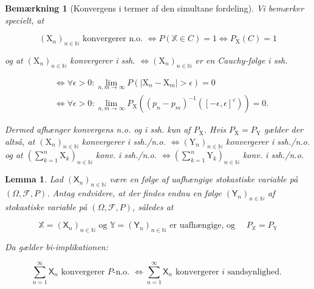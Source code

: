 \documentclass{article}
\newcommand{\1}{\mathbbm{1}}
\newtheorem{lemma}[theorem]{Lemma}
\newtheorem{remark}[theorem]{Bemærkning}
\theoremstyle{boxed}
\begin{document}
\begin{remark}[Konvergens i termer af den simultane fordeling] 
    Vi bemærker specielt, at

$$
\left(\mathrm{X}_n\right)_{n \in \mathbb{N}} \text { konvergerer n.o. } \Longleftrightarrow P(\mathbb{X} \in C)=1 \Longleftrightarrow P_{\mathrm{X}}(C)=1
$$

og at
$\left(\mathrm{X}_n\right)_{n \in \mathbb{N}}$ konvergerer i ssh. $\Longleftrightarrow\left(\mathrm{X}_n\right)_{n \in \mathbb{N}}$ er en Cauchy-følge i ssh.

$$
\begin{aligned}
& \Longleftrightarrow \forall \epsilon>0: \lim _{n, m \rightarrow \infty} P\left(\left|\mathrm{X}_n-\mathrm{X}_m\right|>\epsilon\right)=0 \\
& \Longleftrightarrow \forall \epsilon>0: \lim _{n, m \rightarrow \infty} P_{\mathrm{X}}\left(\left(p_n-p_m\right)^{-1}\left([-\epsilon, \epsilon]^c\right)\right)=0 .
\end{aligned}
$$


Dermed afhænger konvergens n.o. og i ssh. kun af $P_{\mathrm{X}}$.
Hvis $P_{\mathrm{X}}=P_{\mathrm{Y}}$ gælder der altså, at
$\left(\mathrm{X}_n\right)_{n \in \mathbb{N}}$ konvergerer i ssh./n.o. $\Longleftrightarrow\left(\mathrm{Y}_n\right)_{n \in \mathbb{N}}$ konvergerer i ssh./n.o.
og at
$\left(\sum_{k=1}^n \mathrm{X}_k\right)_{n \in \mathbb{N}}$ konv. i ssh./n.o. $\Longleftrightarrow\left(\sum_{k=1}^n \mathrm{Y}_k\right)_{n \in \mathbb{N}}$ konv. i ssh./n.o.
\end{remark}
\begin{theorem-box}
    \begin{lemma}
        Lad $\left(\mathsf{X}_n\right)_{n \in \mathbb{N}}$ være en følge af uafhængige stokastiske variable på $(\Omega, \mathcal{F}, P)$.
Antag endvidere, at der findes endnu en følge $\left(\mathsf{Y}_n\right)_{n \in \mathbb{N}}$ af stokastiske variable på $(\Omega, \mathcal{F}, P)$, således at

$$
\mathbb{X}=\left(\mathsf{X}_n\right)_{n \in \mathbb{N}} \text { og } \mathbb{Y}=\left(\mathsf{Y}_n\right)_{n \in \mathbb{N}} \text { er uafhængige, og } \quad P_{\mathbb{X}}=P_{\mathbb{Y}}
$$


Da gælder bi-implikationen:

$$
\sum_{n=1}^{\infty} \mathsf{X}_n \text { konvergerer } P \text {-n.o. } \Longleftrightarrow \sum_{n=1}^{\infty} \mathsf{X}_n \text { konvergerer } i \text { sandsynlighed. }
$$

    \end{lemma}
\end{theorem-box}
\end{document}

